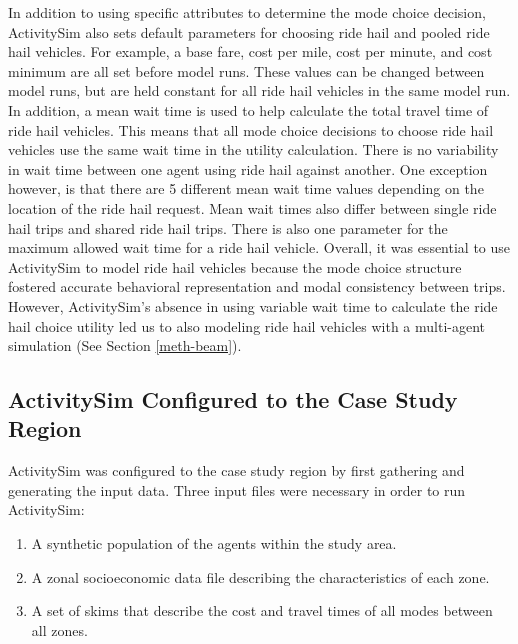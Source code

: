 \documentclass[fancy, masters]{byuthesis}
\providecommand{\tightlist}{%
  \setlength{\itemsep}{0pt}\setlength{\parskip}{0pt}}
\begin{document}
In addition to using specific attributes to determine the mode choice decision, ActivitySim also sets default parameters for choosing ride hail and pooled ride hail vehicles. For example, a base fare, cost per mile, cost per minute, and cost minimum are all set before model runs. These values can be changed between model runs, but are held constant for all ride hail vehicles in the same model run. In addition, a mean wait time is used to help calculate the total travel time of ride hail vehicles. This means that all mode choice decisions to choose ride hail vehicles use the same wait time in the utility calculation. There is no variability in wait time between one agent using ride hail against another. One exception however, is that there are 5 different mean wait time values depending on the location of the ride hail request. Mean wait times also differ between single ride hail trips and shared ride hail trips. There is also one parameter for the maximum allowed wait time for a ride hail vehicle. Overall, it was essential to use ActivitySim to model ride hail vehicles because the mode choice structure fostered accurate behavioral representation and modal consistency between trips. However, ActivitySim's absence in using variable wait time to calculate the ride hail choice utility led us to also modeling ride hail vehicles with a multi-agent simulation (See Section \ref{meth-beam}).

\hypertarget{activitysim-configured-to-the-case-study-region}{%
\subsection{ActivitySim Configured to the Case Study Region}\label{activitysim-configured-to-the-case-study-region}}

ActivitySim was configured to the case study region by first gathering and generating the input data. Three input files were necessary in order to run ActivitySim:

\begin{enumerate}
\def\labelenumi{\arabic{enumi}.}
\tightlist
\item
  A synthetic population of the agents within the study area.
\item
  A zonal socioeconomic data file describing the characteristics of each zone.
\item
  A set of skims that describe the cost and travel times of all modes between all zones.
\end{enumerate}
\end{document}
